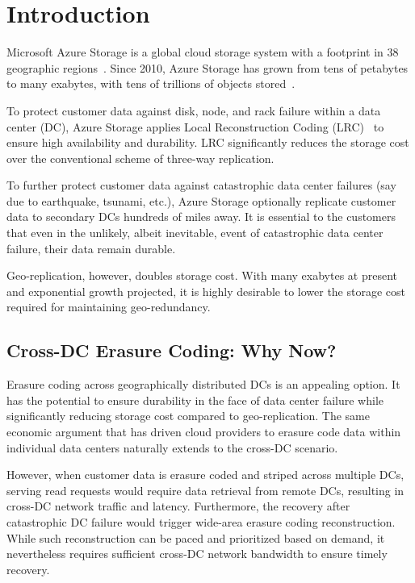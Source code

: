 \section{Introduction}

Microsoft Azure Storage is a global cloud storage system with a footprint in 38 geographic
regions~\cite{bib:azureregions}. Since 2010, Azure Storage has grown from tens of
petabytes to many exabytes, with tens of trillions of objects stored~\cite{greenberg15sdn}.

To protect customer data against disk, node, and rack failure within a data
center (DC), Azure Storage applies Local Reconstruction Coding (LRC)~\cite{huang12erasure}
to ensure high availability and durability. 
LRC significantly reduces the storage cost over the conventional scheme of
three-way replication.

To further protect customer data against catastrophic data center failures
(say due to earthquake, tsunami, etc.),
Azure Storage optionally replicate customer data to secondary DCs hundreds of miles away.
It is essential to the customers that even in the unlikely, albeit inevitable,
event of catastrophic data center failure, their data remain durable.

Geo-replication, however, doubles storage cost.
With many exabytes at present and exponential growth projected,
it is highly desirable to lower the storage cost
required for maintaining geo-redundancy.

\subsection{Cross-DC Erasure Coding: Why Now?}

Erasure coding across geographically distributed DCs is an appealing option.
It has the potential to ensure durability in the face of data center failure
while significantly reducing storage cost compared to geo-replication.
The same economic argument that has driven cloud providers to erasure code data
within individual data centers naturally extends to the cross-DC scenario.

However, when customer data is erasure coded and striped across multiple DCs, 
serving read requests would require data retrieval from remote DCs, resulting in
cross-DC network traffic and latency. Furthermore, the recovery after catastrophic
DC failure would trigger wide-area erasure coding reconstruction. While such
reconstruction can be paced and prioritized based on demand, it nevertheless
requires sufficient cross-DC network bandwidth to ensure timely recovery.

